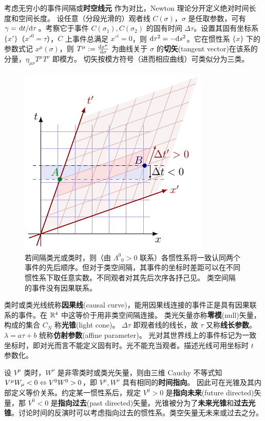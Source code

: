 考虑无穷小的事件间隔或\textbf{时空线元}
作为对比，Newton 理论分开定义绝对时间长度和空间长度。
设任意（分段光滑的）观者线 $C(\sigma)$，$\sigma$ 是任取参数，可有 $\gamma=\dv*{t}{\tau}$。考察它于事件 $C(\sigma_1),C(\sigma_2)$ 的固有时间 $\Delta\tau$。设置其固有坐标系 $\{x'\}$（$x'^0=\tau$），$C$ 上事件总满足 $x'^i=0$，则 $\dd\tau^2=-\dd s^2$。它在惯性系 $\{x\}$ 下的参数式记 $x^\mu(\sigma)$，则
$T^\mu:=\dv{x^\mu}{\sigma}$ 为曲线关于 $\sigma$ 的\textbf{切矢}(tangent vector)在该系的分量，$\eta_{\mu\nu}T^\mu T^\nu$ 即模方。
切矢按模方符号（进而相应曲线）可类似分为三类。
\begin{figure}[t]
    \centering
    \includegraphics[width=.35\textwidth]{fig/chpt01/order.pdf}
    \caption{\small 若间隔类光或类时，则（由 $\Lambda^0{}_0>0$ 联系）各惯性系将一致认同两个事件的先后顺序。但对于类空间隔，其事件的坐标时差距可以在不同惯性系下取任意实数。不同观者对其先后次序各抒己见。
    类空间隔的事件没有因果联系。}
    \label{fig:spacelike}
\end{figure}
类时或类光线统称\textbf{因果线}(causal curve)，能用因果线连接的事件正是具有因果联系的事件。在 $\mathbb{R}^4$ 中这等价于用非类空间隔连接。
类光矢量亦称\textbf{零模}(null)矢量，构成的集合 $C_N$ 称\textbf{光锥}(light cone)。
$\Delta\tau$ 即观者线的线长，故 $\tau$ 又称\textbf{线长参数}。$\lambda=a\tau+b$ 统称\textbf{仿射参数}(affine parameter)。
光对其世界线上的事件标记为一致坐标时，即对光而言不能定义固有时。光不能充当观者。描述光线可用坐标时 $t$ 参数化。

设 $V^\mu$ 类时，$W^\nu$ 是非零类时或类光矢量，则由三维 Cauchy 不等式知 $V^\mu W_\mu<0\Leftrightarrow V^{0} W^{0}>0$，即 $V^\mu,W^\nu$ 具有相同的\textbf{时间指向}。
因此可在光锥及其内部定义等价关系。约定某一惯性系后，规定 $V^0>0$ 是\textbf{指向未来}(future directed)矢量，那 $V^0<0$ 是\textbf{指向过去}(past directed)矢量。光锥被分为了\textbf{未来光锥}和\textbf{过去光锥}。讨论时间的反演时可以考虑指向过去的惯性系。类空矢量无未来或过去之分。

